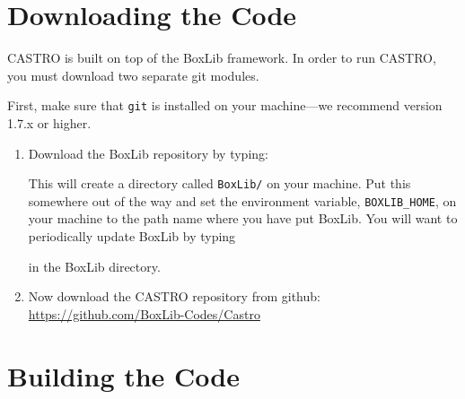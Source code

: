 
\section{Downloading the Code}

CASTRO is built on top of the BoxLib framework.  In order to run CASTRO, you must download
two separate git modules.

\vspace{.1in}

\noindent First, make sure that {\tt git} is installed on your machine---we recommend version 1.7.x or higher.

\vspace{.1in}

\begin{enumerate}

\item Download the BoxLib repository by typing: 


\noindent This will create a directory called {\tt BoxLib/} on your
machine.  Put this somewhere out of the way and set the environment
variable, {\tt BOXLIB\_HOME}, on your machine to the path name where
you have put BoxLib.  You will want to periodically update BoxLib by
typing


in the BoxLib directory.  

\item Now download the CASTRO repository from {\sf github}:
  \url{https://github.com/BoxLib-Codes/Castro}

\end{enumerate}


\section{Building the Code}

